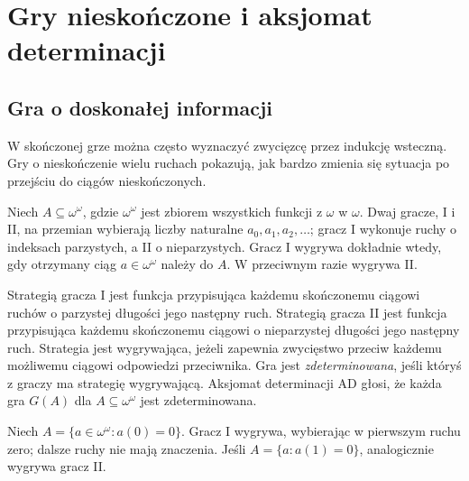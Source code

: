 \chapter{Gry nieskończone i aksjomat determinacji}\label{ch:determinacy}

\providecommand{\atlasref}[2]{#2}
\section{Gra o doskonałej informacji}
W skończonej grze można często wyznaczyć zwycięzcę przez indukcję wsteczną. Gry o nieskończenie wielu ruchach pokazują, jak bardzo zmienia się sytuacja po przejściu do ciągów nieskończonych.
\begin{definicja}[Gra $G(A)$]\label{def:game-a}
Niech $A\subseteq\omega^\omega$, gdzie $\omega^\omega$ jest zbiorem wszystkich funkcji z $\omega$ w $\omega$. Dwaj gracze, I i II, na przemian wybierają liczby naturalne $a_0,a_1,a_2,\ldots$; gracz I wykonuje ruchy o indeksach parzystych, a II o nieparzystych. Gracz I wygrywa dokładnie wtedy, gdy otrzymany ciąg $a\in\omega^\omega$ należy do $A$. W przeciwnym razie wygrywa II.
\end{definicja}
\begin{definicja}\label{def:strategy-ad}
Strategią gracza I jest funkcja przypisująca każdemu skończonemu ciągowi ruchów o parzystej długości jego następny ruch. Strategią gracza II jest funkcja przypisująca każdemu skończonemu ciągowi o nieparzystej długości jego następny ruch. Strategia jest wygrywająca, jeżeli zapewnia zwycięstwo przeciw każdemu możliwemu ciągowi odpowiedzi przeciwnika. Gra jest \emph{zdeterminowana}, jeśli któryś z graczy ma strategię wygrywającą. Aksjomat determinacji $\mathrm{AD}$ głosi, że każda gra $G(A)$ dla $A\subseteq\omega^\omega$ jest zdeterminowana.
\end{definicja}
\begin{przyklad}
Niech $A=\{a\in\omega^\omega:a(0)=0\}$. Gracz I wygrywa, wybierając w pierwszym ruchu zero; dalsze ruchy nie mają znaczenia. Jeśli $A=\{a:a(1)=0\}$, analogicznie wygrywa gracz II.
\end{przyklad}
